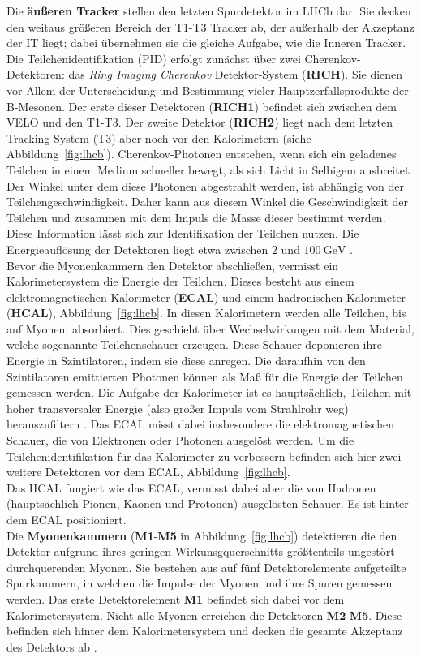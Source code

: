 Die \textbf{äußeren Tracker} stellen den letzten Spurdetektor im LHCb dar. Sie decken den weitaus größeren Bereich der T1-T3 Tracker ab, der außerhalb der Akzeptanz der IT liegt; dabei übernehmen sie die gleiche Aufgabe, wie die Inneren Tracker.\\
%
Die Teilchenidentifikation (PID) erfolgt zunächst über zwei Cherenkov-Detektoren: das \textit{Ring Imaging Cherenkov} Detektor-System (\textbf{RICH}). Sie dienen vor Allem der Unterscheidung und Bestimmung vieler Hauptzerfallsprodukte der B-Mesonen\cite{lhcb}. Der erste dieser Detektoren (\textbf{RICH1}) befindet sich zwischen dem VELO und den T1-T3. Der zweite Detektor (\textbf{RICH2}) liegt nach dem letzten Tracking-System (T3) aber noch vor den Kalorimetern (siehe Abbildung~\ref{fig:lhcb}). Cherenkov-Photonen entstehen, wenn sich ein geladenes Teilchen in einem Medium schneller bewegt, als sich Licht in Selbigem ausbreitet. Der Winkel unter dem diese Photonen abgestrahlt werden, ist abhängig von der Teilchengeschwindigkeit. Daher kann aus diesem Winkel die Geschwindigkeit der Teilchen und zusammen mit dem Impuls die Masse dieser bestimmt werden. Diese Information lässt sich zur Identifikation der Teilchen nutzen. Die Energieauflösung der Detektoren liegt etwa zwischen $2$ und $\SI{100}{\giga\electronvolt}$ \cite{lhcb}.\\
%
Bevor die Myonenkammern den Detektor abschließen, vermisst ein Kalorimetersystem die Energie der Teilchen. Dieses besteht aus einem elektromagnetischen Kalorimeter (\textbf{ECAL}) und einem hadronischen Kalorimeter (\textbf{HCAL}), Abbildung~\ref{fig:lhcb}. In  diesen Kalorimetern werden alle Teilchen, bis auf Myonen, absorbiert. Dies geschieht über Wechselwirkungen mit dem Material, welche sogenannte Teilchenschauer erzeugen. Diese Schauer deponieren ihre Energie in Szintilatoren, indem sie diese anregen. Die daraufhin von den Szintilatoren emittierten Photonen können als Maß für die Energie der Teilchen gemessen werden. Die Aufgabe der Kalorimeter ist es hauptsächlich, Teilchen mit hoher transversaler Energie (also großer Impuls vom Strahlrohr weg) herauszufiltern \cite{lhcb}. Das ECAL misst dabei insbesondere die elektromagnetischen Schauer, die von Elektronen oder Photonen ausgelöst werden. Um die Teilchenidentifikation für das Kalorimeter zu verbessern befinden sich hier zwei weitere Detektoren vor dem ECAL, Abbildung~\ref{fig:lhcb}. \\
Das HCAL fungiert wie das ECAL, vermisst dabei aber die von Hadronen (hauptsächlich Pionen, Kaonen und Protonen) ausgelösten Schauer. Es ist hinter dem ECAL positioniert. \\
%
Die \textbf{Myonenkammern} (\textbf{M1}-\textbf{M5} in Abbildung~\ref{fig:lhcb}) detektieren die den Detektor aufgrund ihres geringen Wirkunsgquerschnitts größtenteils ungestört durchquerenden Myonen. Sie bestehen aus auf fünf Detektorelemente aufgeteilte Spurkammern, in welchen die Impulse der Myonen und ihre Spuren gemessen werden. Das erste Detektorelement \textbf{M1} befindet sich dabei vor dem Kalorimetersystem. Nicht alle Myonen erreichen die Detektoren \textbf{M2}-\textbf{M5}. Diese befinden sich hinter dem Kalorimetersystem und decken die gesamte Akzeptanz des Detektors ab \cite{lhcb}.
